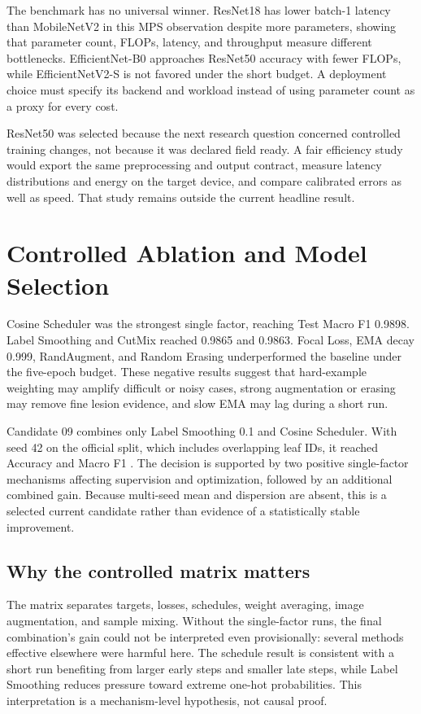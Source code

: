 \documentclass[11pt]{article}
\begin{document}
The benchmark has no universal winner. ResNet18 has lower batch-1 latency than MobileNetV2 in this MPS observation despite more parameters, showing that parameter count, FLOPs, latency, and throughput measure different bottlenecks. EfficientNet-B0 approaches ResNet50 accuracy with fewer FLOPs, while EfficientNetV2-S is not favored under the short budget. A deployment choice must specify its backend and workload instead of using parameter count as a proxy for every cost.

ResNet50 was selected because the next research question concerned controlled training changes, not because it was declared field ready. A fair efficiency study would export the same preprocessing and output contract, measure latency distributions and energy on the target device, and compare calibrated errors as well as speed. That study remains outside the current headline result.

\section{Controlled Ablation and Model Selection}



Cosine Scheduler was the strongest single factor, reaching Test Macro F1 0.9898. Label Smoothing and CutMix reached 0.9865 and 0.9863. Focal Loss, EMA decay 0.999, RandAugment, and Random Erasing underperformed the baseline under the five-epoch budget. These negative results suggest that hard-example weighting may amplify difficult or noisy cases, strong augmentation or erasing may remove fine lesion evidence, and slow EMA may lag during a short run.

Candidate 09 combines only Label Smoothing 0.1 and Cosine Scheduler. With seed 42 on the official split, which includes \PDAOfficialOverlap{} overlapping leaf IDs, it reached Accuracy \PDAFinalAccuracy{} and Macro F1 \PDAFinalMacroFOne{}. The decision is supported by two positive single-factor mechanisms affecting supervision and optimization, followed by an additional combined gain. Because multi-seed mean and dispersion are absent, this is a selected current candidate rather than evidence of a statistically stable improvement.

\subsection*{Why the controlled matrix matters}

The matrix separates targets, losses, schedules, weight averaging, image augmentation, and sample mixing. Without the single-factor runs, the final combination's gain could not be interpreted even provisionally: several methods effective elsewhere were harmful here. The schedule result is consistent with a short run benefiting from larger early steps and smaller late steps, while Label Smoothing reduces pressure toward extreme one-hot probabilities. This interpretation is a mechanism-level hypothesis, not causal proof.
\end{document}
